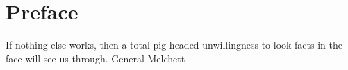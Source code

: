 \chapter*{Preface}                                  \label{ch:preface}

If nothing else works, then a total pig-headed unwillingness to look facts in the face will see us through.
General Melchett
\cleardoublepage

